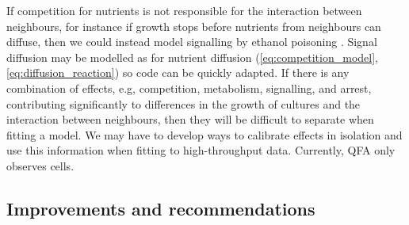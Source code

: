 If competition for nutrients is not responsible for the interaction
between neighbours, for instance if growth stops before nutrients from
neighbours can diffuse, then we could instead model signalling by
ethanol poisoning \citep{fujita2006}. Signal diffusion may be modelled
as for nutrient diffusion
(\ref{eq:competition_model},\ref{eq:diffusion_reaction}) so code can
be quickly adapted. If there is any combination of effects, e.g,
competition, metabolism, signalling, and arrest, contributing
significantly to differences in the growth of cultures and the
interaction between neighbours, then they will be difficult to
separate when fitting a model. We may have to develop ways to
calibrate effects in isolation and use this information when fitting
to high-throughput data. Currently, QFA only observes cells.

\subsection{Improvements and recommendations}

